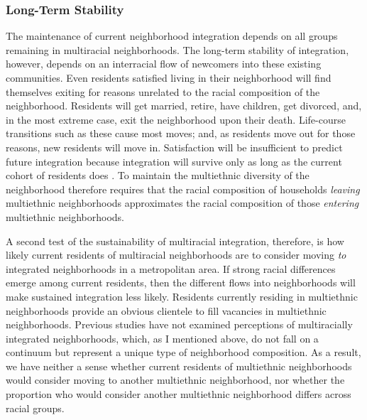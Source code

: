 \documentclass{baderart}
\begin{document}
\subsubsection{Long-Term Stability}\label{long-term-stability}

The maintenance of current neighborhood integration depends on all groups remaining in multiracial neighborhoods. The long-term stability of integration, however, depends on an interracial flow of newcomers into these existing communities. Even residents satisfied living in their neighborhood will find themselves exiting for reasons unrelated to the racial composition of the neighborhood. Residents will get married, retire, have children, get divorced, and, in the most extreme case, exit the neighborhood upon their death. Life-course transitions such as these cause most moves; and, as residents move out for those reasons, new residents will move in. Satisfaction will be insufficient to predict future integration because integration will survive only as long as the current cohort of residents does \citep[see, e.g., ][]{molotch_racial_1969, woldoff_white_2011}. To maintain the multiethnic diversity of the neighborhood therefore requires that the racial composition of households \emph{leaving} multiethnic neighborhoods approximates the racial composition of those \emph{entering} multiethnic neighborhoods.

A second test of the sustainability of multiracial integration, therefore, is how likely current residents of multiracial neighborhoods are to consider moving \emph{to} integrated neighborhoods in a metropolitan area. If strong racial differences emerge among current residents, then the different flows into neighborhoods will make sustained integration less likely. Residents currently residing in multiethnic neighborhoods provide an obvious clientele to fill vacancies in multiethnic neighborhoods. Previous studies have not examined perceptions of multiracially integrated neighborhoods, which, as I mentioned above, do not fall on a continuum but represent a unique type of neighborhood composition. As a result, we have neither a sense whether current residents of multiethnic neighborhoods would consider moving to another multiethnic neighborhood, nor whether the proportion who would consider another multiethnic neighborhood differs across racial groups.
\end{document}
